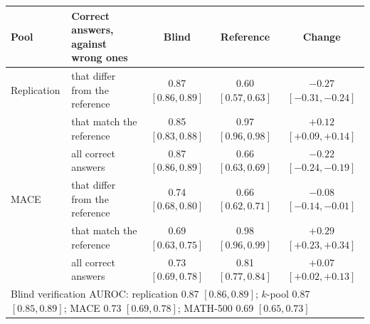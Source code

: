 \begin{tabular}{llccc}
\toprule
Pool & Correct answers, against wrong ones & Blind & Reference & Change \\
\midrule
Replication & that differ from the reference & 0.87 {\scriptsize$[0.86,0.89]$} & 0.60 {\scriptsize$[0.57,0.63]$} & $-0.27$ {\scriptsize$[-0.31,-0.24]$} \\
 & that match the reference & 0.85 {\scriptsize$[0.83,0.88]$} & 0.97 {\scriptsize$[0.96,0.98]$} & $+0.12$ {\scriptsize$[+0.09,+0.14]$} \\
 & all correct answers & 0.87 {\scriptsize$[0.86,0.89]$} & 0.66 {\scriptsize$[0.63,0.69]$} & $-0.22$ {\scriptsize$[-0.24,-0.19]$} \\
\addlinespace
\textsc{MACE} & that differ from the reference & 0.74 {\scriptsize$[0.68,0.80]$} & 0.66 {\scriptsize$[0.62,0.71]$} & $-0.08$ {\scriptsize$[-0.14,-0.01]$} \\
 & that match the reference & 0.69 {\scriptsize$[0.63,0.75]$} & 0.98 {\scriptsize$[0.96,0.99]$} & $+0.29$ {\scriptsize$[+0.23,+0.34]$} \\
 & all correct answers & 0.73 {\scriptsize$[0.69,0.78]$} & 0.81 {\scriptsize$[0.77,0.84]$} & $+0.07$ {\scriptsize$[+0.02,+0.13]$} \\
\midrule
\multicolumn{5}{l}{Blind verification AUROC: replication 0.87 {\scriptsize$[0.86,0.89]$}; $k$-pool 0.87 {\scriptsize$[0.85,0.89]$}; \textsc{MACE} 0.73 {\scriptsize$[0.69,0.78]$}; MATH-500 0.69 {\scriptsize$[0.65,0.73]$}} \\
\bottomrule
\end{tabular}
